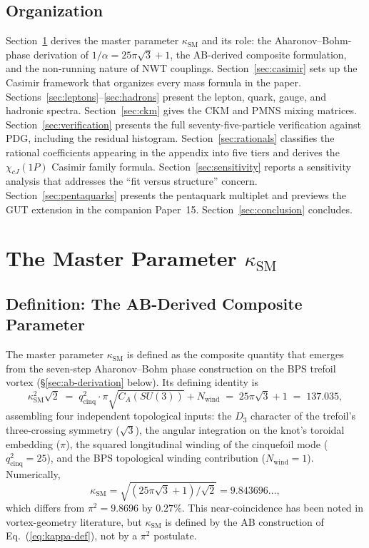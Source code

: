 \documentclass[11pt]{article}
\newcommand{\CA}{C_A}
\newcommand{\ksm}{\kappa_\text{SM}}
\begin{document}
\subsection{Organization}

Section~\ref{sec:kappa} derives the master parameter $\ksm$ and
its role: the Aharonov--Bohm-phase derivation of
$1/\alpha = 25\pi\sqrt{3}+1$, the AB-derived composite formulation,
and the non-running nature of NWT couplings.
Section~\ref{sec:casimir} sets up the Casimir framework that
organizes every mass formula in the paper.
Sections~\ref{sec:leptons}--\ref{sec:hadrons} present the lepton,
quark, gauge, and hadronic spectra.
Section~\ref{sec:ckm} gives the CKM and PMNS mixing matrices.
Section~\ref{sec:verification} presents the full seventy-five-particle
verification against PDG, including the residual histogram.
Section~\ref{sec:rationals} classifies the rational coefficients
appearing in the appendix into five tiers and derives the
$\chi_{cJ}(1P)$ Casimir family formula.
Section~\ref{sec:sensitivity} reports a sensitivity analysis that
addresses the ``fit versus structure'' concern.
Section~\ref{sec:pentaquarks} presents the pentaquark multiplet
and previews the GUT extension in the companion Paper~15.
Section~\ref{sec:conclusion} concludes.

\section{The Master Parameter $\ksm$}
\label{sec:kappa}

\subsection{Definition: The AB-Derived Composite Parameter}
\label{sec:kappa-def}

The master parameter $\ksm$ is defined as the composite quantity
that emerges from the seven-step Aharonov--Bohm phase construction
on the BPS trefoil vortex (\S\ref{sec:ab-derivation} below).  Its
defining identity is
\begin{equation}
  \ksm^2\sqrt{2}
  \;=\; q_\text{cinq}^2\cdot\pi\sqrt{\CA(SU(3))} + N_\text{wind}
  \;=\; 25\pi\sqrt{3} + 1
  \;=\; 137.035,
\label{eq:kappa-def}
\end{equation}
assembling four independent topological inputs: the $D_3$
character of the trefoil's three-crossing symmetry ($\sqrt{3}$),
the angular integration on the knot's toroidal embedding ($\pi$),
the squared longitudinal winding of the cinquefoil mode
($q_\text{cinq}^2 = 25$), and the BPS topological winding
contribution ($N_\text{wind} = 1$).  Numerically,
\begin{equation}
  \ksm = \sqrt{(25\pi\sqrt{3}+1)/\sqrt{2}} = 9.843696\ldots,
\end{equation}
which differs from $\pi^2 = 9.8696$ by $0.27\%$.  This
near-coincidence has been noted in vortex-geometry literature,
but $\ksm$ is defined by the AB construction of
Eq.~(\ref{eq:kappa-def}), not by a $\pi^2$ postulate.
\end{document}
